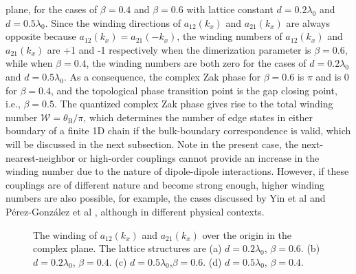 \documentclass[aps,pra,reprint,groupedaddress,nofootinbib,longbibliography,showpacs]{revtex4-1}
\begin{document}
plane, for the cases of $\beta=0.4$ and $\beta=0.6$ with lattice constant $d=0.2\lambda_0$ and $d=0.5\lambda_0$. Since the winding directions of $a_{12}(k_x)$ and $a_{21}(k_x)$ are always opposite because $a_{12}(k_x)=a_{21}(-k_x)$, the winding numbers of $a_{12}(k_x)$ and $a_{21}(k_x)$ are +1 and -1 respectively when the dimerization parameter is $\beta=0.6$, while when $\beta=0.4$, the winding numbers are both zero for the cases of $d=0.2\lambda_0$ and $d=0.5\lambda_0$. As a consequence, the complex Zak phase for $\beta=0.6$ is $\pi$ and is $0$ for $\beta=0.4$, and the topological phase transition point is the gap closing point, i.e., $\beta=0.5$. 
The quantized complex Zak phase gives rise to the total winding number $\mathcal{W}=\theta_\mathrm{B}/\pi$, which determines the number of edge states in either boundary of a finite 1D chain if the bulk-boundary correspondence is valid, which will be discussed in the next subsection. Note in the present case, the next-nearest-neighbor or high-order couplings cannot provide an increase in the winding number due to the nature of dipole-dipole interactions. However, if these couplings are of different nature and become strong enough, higher winding numbers are also possible, for example, the cases discussed by  Yin et al \cite{yinPRA2018} and P{\'e}rez-Gonz{\'a}lez et al \cite{perezArxiv2018}, although in different physical contexts.


\begin{figure}[htbp]
	\centering
	\flushleft
	\hspace{0.01in}
	\hspace{0.01in}
\hspace{0.01in}
	\caption{The winding of $a_{12}(k_x)$ and $a_{21}(k_x)$ over the origin in the complex plane. The lattice structures are (a) $d=0.2\lambda_0$, $\beta=0.6$. (b) $d=0.2\lambda_0$, $\beta=0.4$. (c) $d=0.5\lambda_0$,$\beta=0.6$. (d) $d=0.5\lambda_0$, $\beta=0.4$.}\label{windingnumber}
	
\end{figure}
\end{document}
